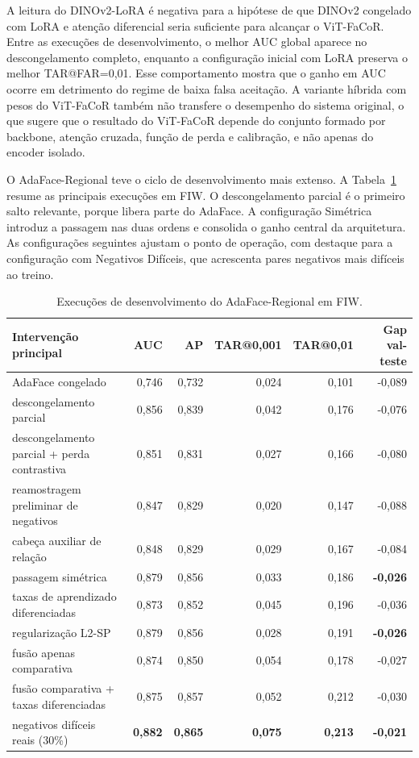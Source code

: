 A leitura do DINOv2-LoRA é negativa para a hipótese de que DINOv2 congelado com LoRA e atenção diferencial seria suficiente para alcançar o ViT-FaCoR. Entre as execuções de desenvolvimento, o melhor AUC global aparece no descongelamento completo, enquanto a configuração inicial com LoRA preserva o melhor TAR@FAR=0,01. Esse comportamento mostra que o ganho em AUC ocorre em detrimento do regime de baixa falsa aceitação. A variante híbrida com pesos do ViT-FaCoR também não transfere o desempenho do sistema original, o que sugere que o resultado do ViT-FaCoR depende do conjunto formado por backbone, atenção cruzada, função de perda e calibração, e não apenas do encoder isolado.

O AdaFace-Regional teve o ciclo de desenvolvimento mais extenso. A Tabela~\ref{tab:adaface_regional_execucoes} resume as principais execuções em FIW. O descongelamento parcial é o primeiro salto relevante, porque libera parte do AdaFace. A configuração Simétrica introduz a passagem nas duas ordens e consolida o ganho central da arquitetura. As configurações seguintes ajustam o ponto de operação, com destaque para a configuração com Negativos Difíceis, que acrescenta pares negativos mais difíceis ao treino.

\begin{table}[h]
\centering
\scriptsize
\setlength{\tabcolsep}{3pt}
\caption{Execuções de desenvolvimento do AdaFace-Regional em FIW.}
\label{tab:adaface_regional_execucoes}
\begin{tabular}{lrrrrr}
\hline
\textbf{Intervenção principal} & \textbf{AUC} & \textbf{AP} & \textbf{TAR@0,001} & \textbf{TAR@0,01} & \textbf{Gap val-teste} \\
\hline
AdaFace congelado               & 0{,}746 & 0{,}732 & 0{,}024 & 0{,}101 & -0{,}089 \\
descongelamento parcial          & 0{,}856 & 0{,}839 & 0{,}042 & 0{,}176 & -0{,}076 \\
descongelamento parcial + perda contrastiva & 0{,}851 & 0{,}831 & 0{,}027 & 0{,}166 & -0{,}080 \\
reamostragem preliminar de negativos & 0{,}847 & 0{,}829 & 0{,}020 & 0{,}147 & -0{,}088 \\
cabeça auxiliar de relação       & 0{,}848 & 0{,}829 & 0{,}029 & 0{,}167 & -0{,}084 \\
passagem simétrica               & 0{,}879 & 0{,}856 & 0{,}033 & 0{,}186 & \textbf{-0{,}026} \\
taxas de aprendizado diferenciadas & 0{,}873 & 0{,}852 & 0{,}045 & 0{,}196 & -0{,}036 \\
regularização L2-SP              & 0{,}879 & 0{,}856 & 0{,}028 & 0{,}191 & \textbf{-0{,}026} \\
fusão apenas comparativa         & 0{,}874 & 0{,}850 & 0{,}054 & 0{,}178 & -0{,}027 \\
fusão comparativa + taxas diferenciadas & 0{,}875 & 0{,}857 & 0{,}052 & 0{,}212 & -0{,}030 \\
negativos difíceis reais (30\%)  & \textbf{0{,}882} & \textbf{0{,}865} & \textbf{0{,}075} & \textbf{0{,}213} & \textbf{-0{,}021} \\
\hline
\end{tabular}
\end{table}


